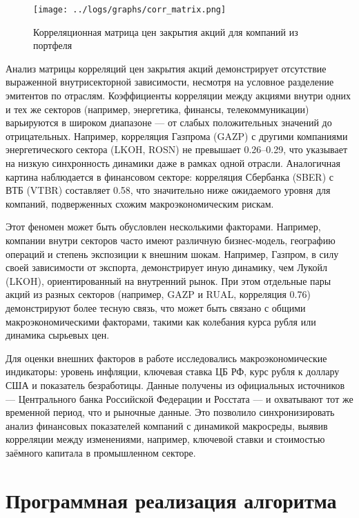 \documentclass[]{article}
\begin{document}
	\begin{figure}[ht] %
		\centering %
		\texttt{[image: ../logs/graphs/corr\_matrix.png]} %
		\caption{Корреляционная матрица цен закрытия акций для компаний из портфеля} %
		\label{fig:my_image} %
	\end{figure}
	
	Анализ матрицы корреляций цен закрытия акций демонстрирует отсутствие выраженной внутрисекторной зависимости, несмотря на условное разделение эмитентов по отраслям. Коэффициенты корреляции между акциями внутри одних и тех же секторов (например, энергетика, финансы, телекоммуникации) варьируются в широком диапазоне — от слабых положительных значений до отрицательных. Например, корреляция Газпрома (GAZP) с другими компаниями энергетического сектора (LKOH, ROSN) не превышает 0.26–0.29, что указывает на низкую синхронность динамики даже в рамках одной отрасли. Аналогичная картина наблюдается в финансовом секторе: корреляция Сбербанка (SBER) с ВТБ (VTBR) составляет 0.58, что значительно ниже ожидаемого уровня для компаний, подверженных схожим макроэкономическим рискам.
	
	Этот феномен может быть обусловлен несколькими факторами. Например, компании внутри секторов часто имеют различную бизнес-модель, географию операций и степень экспозиции к внешним шокам. Например, Газпром, в силу своей зависимости от экспорта, демонстрирует иную динамику, чем Лукойл (LKOH), ориентированный на внутренний рынок. При этом отдельные пары акций из разных секторов (например, GAZP и RUAL, корреляция 0.76) демонстрируют более тесную связь, что может быть связано с общими макроэкономическими факторами, такими как колебания курса рубля или динамика сырьевых цен.
	
	Для оценки внешних факторов в работе исследовались макроэкономические индикаторы: уровень инфляции, ключевая ставка ЦБ РФ, курс рубля к доллару США и показатель безработицы. Данные получены из официальных источников — Центрального банка Российской Федерации и Росстата — и охватывают тот же временной период, что и рыночные данные. Это позволило синхронизировать анализ финансовых показателей компаний с динамикой макросреды, выявив корреляции между изменениями, например, ключевой ставки и стоимостью заёмного капитала в промышленном секторе.
	
	\section{Программная реализация алгоритма}
	
\end{document}
